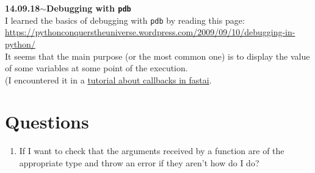 \documentclass[11pt,a4paper]{article}
\newenvironment{loggentry}[2]%
{\noindent\textbf{#1}\hspace{1cm}$\mathbf{\sim}$\text{ }\textbf{#2}\\}{\vspace{0.5cm}}
\begin{document}
\begin{loggentry}{14.09.18}{Debugging with \texttt{pdb}}
I learned the basics of debugging with \texttt{pdb} by reading this page:\\
\url{https://pythonconquerstheuniverse.wordpress.com/2009/09/10/debugging-in-python/}\\
It seems that the main purpose (or the most common one) is to display the value of some variables at some point of the execution.\\
(I encountered it in a \href{https://github.com/sgugger/Deep-Learning/blob/master/Using%20the%20callback%20system%20in%20fastai.ipynb}{tutorial about callbacks in fastai}.\\

\end{loggentry}

\section{Questions}
\begin{enumerate}
\item If I want to check that the arguments received by a function are of the appropriate type and throw an error if they aren't how do I do?
\end{enumerate}
\end{document}
